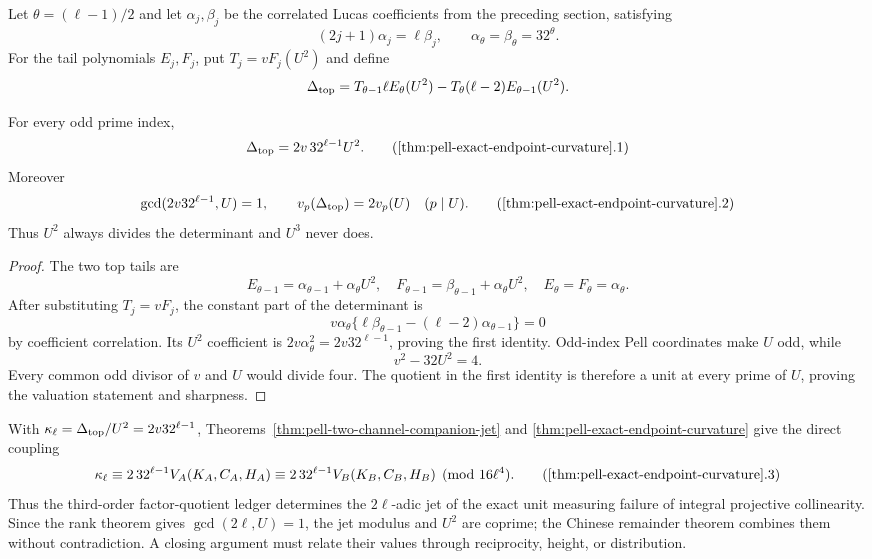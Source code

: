 Let $\theta=(\ell-1)/2$ and let $\alpha_j,\beta_j$ be the correlated
Lucas coefficients from the preceding section, satisfying
\[
 (2j+1)\alpha_j=\ell\beta_j,\qquad
 \alpha_\theta=\beta_\theta=32^\theta.
\]
For the tail polynomials $E_j,F_j$, put $T_j=vF_j(U^2)$ and define
\[
 \Delta_{\rm top}=
 T_{\theta-1}\ell E_\theta(U^2)
 -T_\theta(\ell-2)E_{\theta-1}(U^2).
\]

\begin{theorem}
\label{thm:pell-exact-endpoint-curvature}
For every odd prime index,
\[
                 \Delta_{\rm top}=2v\,32^{\ell-1}U^2.                 \tag{\ref{thm:pell-exact-endpoint-curvature}.1}
\]
Moreover
\[
 \gcd(2v32^{\ell-1},U)=1,\qquad
 v_p(\Delta_{\rm top})=2v_p(U)\quad(p\mid U).           \tag{\ref{thm:pell-exact-endpoint-curvature}.2}
\]
Thus $U^2$ always divides the determinant and $U^3$ never does.
\end{theorem}

\begin{proof}
The two top tails are
\[
 E_{\theta-1}=\alpha_{\theta-1}+\alpha_\theta U^2,
 \quad F_{\theta-1}=\beta_{\theta-1}+\alpha_\theta U^2,
 \quad E_\theta=F_\theta=\alpha_\theta.
\]
After substituting $T_j=vF_j$, the constant part of the determinant is
\[
 v\alpha_\theta
 \{\ell\beta_{\theta-1}-(\ell-2)\alpha_{\theta-1}\}=0
\]
by coefficient correlation.  Its $U^2$ coefficient is
$2v\alpha_\theta^2=2v32^{\ell-1}$, proving the first identity.
Odd-index Pell coordinates make $U$ odd, while
\[
                         v^2-32U^2=4.
\]
Every common odd divisor of $v$ and $U$ would divide four.  The quotient in
the first identity is therefore a unit at every prime of $U$, proving the
valuation statement and sharpness.
\end{proof}

With $\kappa_\ell=\Delta_{\rm top}/U^2=2v32^{\ell-1}$,
Theorems~\ref{thm:pell-two-channel-companion-jet} and
\ref{thm:pell-exact-endpoint-curvature} give the direct coupling
\[
 \kappa_\ell\equiv
 2\,32^{\ell-1}V_A(K_A,C_A,H_A)
 \equiv2\,32^{\ell-1}V_B(K_B,C_B,H_B)\pmod{16\ell^4}.  \tag{\ref{thm:pell-exact-endpoint-curvature}.3}
\]
Thus the third-order factor-quotient ledger determines the
$2\ell$-adic jet of the exact unit measuring failure of integral projective
collinearity.  Since the rank theorem gives $\gcd(2\ell,U)=1$, the jet
modulus and $U^2$ are coprime; the Chinese remainder theorem combines them
without contradiction.  A closing argument must relate their values through
reciprocity, height, or distribution.

